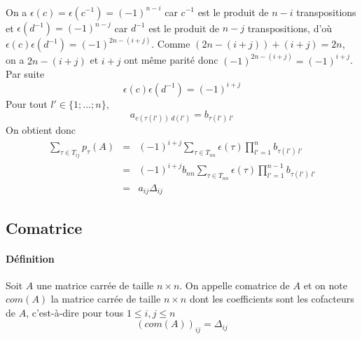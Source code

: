 On a $\epsilon(c) = \epsilon(c^{-1}) = (-1)^{n-i}$ car $c^{-1}$ est le produit de $n-i$ transpositions et $\epsilon(d^{-1}) = (-1)^{n-j}$ car $d^{-1}$ est le produit de $n-j$ transpositions, d'où $\epsilon(c) \epsilon(d^{-1}) = (-1)^{2n - (i+j)}$. Comme $(2n - (i+j)) + (i+j) = 2n$, on a $2n - (i+j)$ et $i+j$ ont même parité donc $(-1)^{2n - (i+j)} = (-1)^{i+j}$. Par suite
$$\epsilon(c) \epsilon(d^{-1}) = (-1)^{i+j}$$
Pour tout $l' \in \{1; \ldots; n \}$, 
$$a_{c(\tau(l')) ~ d(l')} = b_{\tau(l') ~ l'}$$
On obtient donc
\begin{eqnarray*}
  \sum_{\tau \in T_{ij}} p_{\tau}(A) &=& (-1)^{i+j} \sum_{\tau \in T_{nn}} \epsilon(\tau) \prod_{l'=1}^{n} b_{\tau(l') ~ l'} \\
    &=& (-1)^{i+j} b_{nn} \sum_{\tau \in T_{nn}} \epsilon(\tau) \prod_{l' = 1}^{n-1} b_{\tau(l') ~ l'} \\
    &=& a_{ij} \Delta_{ij}
\end{eqnarray*}

%
\subsection{Comatrice}
%
\paragraph{Définition} Soit $A$ une matrice carrée de taille $n \times n$. On appelle comatrice de $A$ et on note $com(A)$ la matrice carrée de taille $n \times n$ dont les coefficients sont les cofacteurs de $A$, c'est-à-dire pour tous $1 \leq i, j \leq n$
$$(com(A))_{ij} = \Delta_{ij}$$

